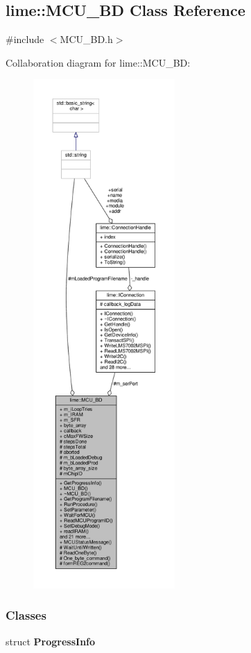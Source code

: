 \subsection{lime\+:\+:M\+C\+U\+\_\+\+BD Class Reference}
\label{classlime_1_1MCU__BD}


{\ttfamily \#include $<$M\+C\+U\+\_\+\+B\+D.\+h$>$}



Collaboration diagram for lime\+:\+:M\+C\+U\+\_\+\+BD\+:
\nopagebreak
\begin{figure}[H]
\begin{center}
\leavevmode
\includegraphics[height=550pt]{d1/d7b/classlime_1_1MCU__BD__coll__graph}
\end{center}
\end{figure}
\subsubsection*{Classes}
\begin{DoxyCompactItemize}
\item 
struct {\bf Progress\+Info}
\end{DoxyCompactItemize}
